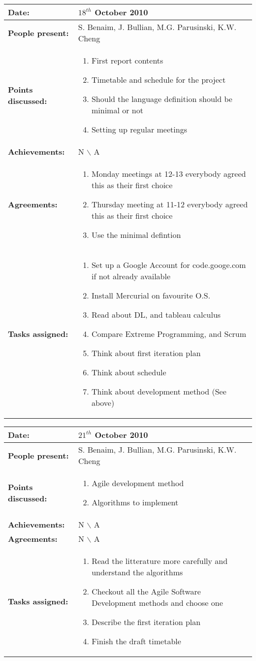 \documentclass[12pt,a4paper]{article}
\newcommand{\meeting}[6]{%
\begin{center}%
\begin{longtable}{| p{3.5cm} | | p{13cm} |}%
\hline%
\textbf{Date:} & #1 \\%
\hline%
\textbf{People present:} &#2 \\%
\hline%
\textbf{Points discussed:} &#3\\%
\hline%
\textbf{Achievements:} &#4 \\%
\hline%
\textbf{Agreements:} &#5 \\%
\hline%
\textbf{Tasks assigned:} &#6  \\%
\hline%
\end{longtable}%
\end{center}%
\bigbreak
}
\begin{document}
\meeting{$18^{th}$ October 2010}%
{S. Benaim, J. Bullian, M.G. Parusinski, K.W. Cheng}%
{ \begin{enumerate} \item First report contents
\item Timetable and schedule for the project
\item Should the language definition should be minimal or not
\item Setting up regular meetings
\end{enumerate} }%
{ N $\backslash$ A}%
{\begin{enumerate}
\item Monday meetings at 12-13 everybody agreed this as their first choice
\item Thursday meeting at 11-12 everybody agreed this as their first choice
\item Use the minimal defintion
\end{enumerate}}
{ \begin{enumerate}
\item Set up a Google Account for code.googe.com if not already available
\item Install Mercurial on favourite O.S.
\item Read about DL, and tableau calculus
\item Compare Extreme Programming, and Scrum
\item Think about first iteration plan
\item Think about schedule
\item Think about development method (See above)
\end{enumerate}}%

\meeting{$21^{th}$ October 2010}%
{S. Benaim, J. Bullian, M.G. Parusinski, K.W. Cheng}%
{ \begin{enumerate} 
\item Agile development method
\item Algorithms to implement
\end{enumerate} }%
{ N $\backslash$ A}%
{N $\backslash$ A}
{ \begin{enumerate}
\item Read the litterature more carefully and understand the algorithms
\item Checkout all the Agile Software Development methods and choose one
\item Describe the first iteration plan
\item Finish the draft timetable
\end{enumerate}}%
\end{document}
